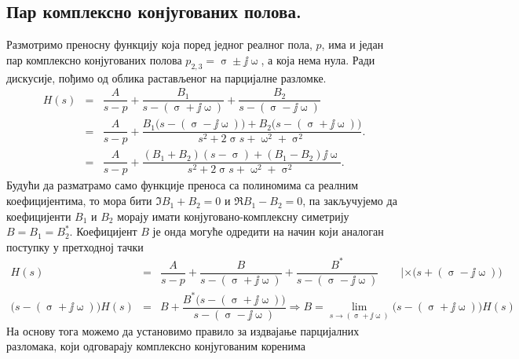 \begin{center}
\end{center}

\subsection{Пар комплексно конјугованих полова.}

Размотримо преносну функцију која поред једног реалног пола, $p$, има и један пар комплексно конјугованих полова
$p_{2,3} = \upsigma \pm \jj\upomega$, а која нема нула. Ради дискусије, пођимо од облика растављеног на парцијалне разломке. 
%
\begin{eqnarray}
    H(s) 
    &=& 
    \dfrac{A}{s - p} + 
    \dfrac{B_1}{s - (\upsigma + \jj\upomega)} + 
    \dfrac{B_2}{s - (\upsigma - \jj\upomega)} 
    \\
    &=& 
    \dfrac{A}{s - p} + 
    \dfrac{
        B_1 \bigl( s - (\upsigma - \jj\upomega) \bigr)
        +
        B_2 \bigl( s - (\upsigma + \jj\upomega) \bigr)
     }{s^2 + 2 \upsigma s + \upomega^2 + \upsigma^2}.  \\[2mm] 
     &=&
     \dfrac{A}{s - p} + 
     \dfrac{
         (B_1 + B_2)(s - \upsigma) +   
         (B_1 - B_2)\jj\upomega
      }{s^2 + 2 \upsigma s + \upomega^2 + \upsigma^2}. 
\end{eqnarray}
%
Будући да разматрамо само функције преноса са полиномима са реалним коефицијентима, то мора бити 
$\Im{B_1 + B_2} = 0$ и $\Re{B_1 - B_2} = 0$, па закључујемо да коефицијенти $B_1$ и $B_2$ морају 
имати конјуговано-комплексну симетрију $B = B_1 = B_2^\ast$. Коефицијент $B$ је онда могуће 
одредити на начин који аналоган поступку у претходној тачки
\begin{eqnarray}
    H(s) 
    &=& 
    \dfrac{A}{s - p} + 
    \dfrac{B}{s - (\upsigma + \jj\upomega)} + 
    \dfrac{B^\ast}{s - (\upsigma - \jj\upomega)} \qquad | \times \bigl( s + (\upsigma - \jj\upomega) \bigr)
    \\
    \bigl( s - (\upsigma + \jj\upomega) \bigr)
    H(s) 
    &=& B + 
    \dfrac{
        B^\ast \bigl( s - (\upsigma + \jj\upomega) \bigr)
    }{s - (\upsigma - \jj\upomega)}
    \Rightarrow
    B = \lim_{{s \to (\upsigma + \jj\upomega)}}  \bigl( s - (\upsigma + \jj\upomega) \bigr)
    H(s) 
\end{eqnarray}
На основу тога можемо да установимо правило за издвајање парцијалних разломака, који одговарају 
комплексно конјугованим коренима 

